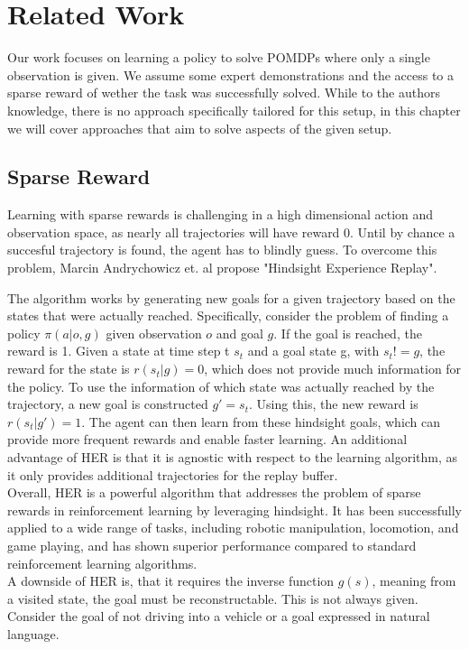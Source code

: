 
\chapter{Related Work}
\label{chapter:RelWork}
Our work focuses on learning a policy to solve POMDPs where only a single observation is given. We assume some expert demonstrations and the access to a sparse 
reward of wether the task was successfully solved. While to the authors knowledge, there is no approach specifically tailored for this setup, 
in this chapter we will cover approaches that aim to solve aspects of the given setup.

\section{Sparse Reward}
\label{sec:HER}
Learning with sparse rewards is challenging in a high dimensional action and observation space, as nearly all trajectories will have reward 0. 
Until by chance a succesful trajectory is found, the agent has to blindly guess. To overcome this problem, Marcin Andrychowicz et. al propose 
"Hindsight Experience Replay".

The algorithm works by generating new goals for a given trajectory based on the states that were actually reached. 
Specifically, consider the problem of finding a policy $\pi(a|o, g)$ given observation $o$ and goal $g$. 
If the goal is reached, the reward is 1. Given a state at time step t $s_t$ and a goal state g, with $s_t != g$, 
the reward for the state is $r(s_t|g) = 0$, which does not provide much information for the policy. 
To use the information of which state was actually
reached by the trajectory, a new goal is constructed $g' = s_t$. Using this, the new reward is $r(s_t|g') = 1$. 
The agent can then learn from these hindsight goals, which can provide more 
frequent rewards and enable faster learning. An additional advantage of HER is that it is agnostic with respect to the learning algorithm, as it only 
provides additional trajectories for the replay buffer.\\

Overall, HER is a powerful algorithm that addresses the problem of sparse rewards in reinforcement learning by leveraging hindsight. It has been successfully 
applied to a wide range of tasks, including robotic manipulation, locomotion, and game playing, and has shown superior performance compared to standard 
reinforcement learning algorithms.\\
A downside of HER is, that it requires the inverse function $g(s)$, meaning from a visited state, the goal must be reconstructable. This is not always given. 
Consider the goal of not driving into a vehicle or a goal expressed in natural language. 

